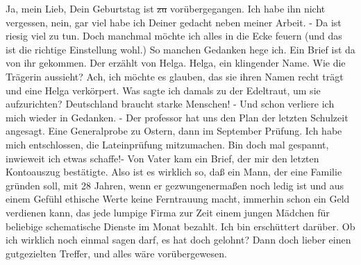 \def\day{27. II. 1944.}
\mktitle

Ja, mein Lieb, Dein Geburtstag ist \st{zu} vor\"{u}bergegangen.
Ich habe ihn nicht vergessen, nein, gar viel habe ich Deiner gedacht neben meiner Arbeit.
- Da ist riesig viel zu tun.
Doch manchmal m\"{o}chte ich alles in die Ecke feuern (und das ist die richtige Einstellung wohl.)
So manchen Gedanken hege ich.
Ein Brief ist da von ihr gekommen.
Der erz\"{a}hlt von Helga.
Helga, ein klingender Name.
Wie die Tr\"{a}gerin aussieht?
Ach, ich m\"{o}chte es glauben, das sie ihren Namen recht tr\"{a}gt und eine Helga verk\"{o}rpert.
Was sagte ich damals zu der Edeltraut, um sie aufzurichten?
Deutschland braucht starke Menschen!
- Und schon verliere ich mich wieder in Gedanken.
- Der professor hat uns den Plan der letzten Schulzeit angesagt.
Eine Generalprobe zu Ostern, dann im September Pr\"{u}fung.
Ich habe mich entschlossen, die Lateinpr\"{u}fung mitzumachen.
Bin doch mal gespannt, inwieweit ich etwas schaffe!-
Von Vater kam ein Brief, der mir den letzten Kontoauszug best\"{a}tigte.
Also ist es wirklich so, da{\ss} ein Mann, der eine Familie gr\"{u}nden soll, mit 28 Jahren, wenn er gezwungenerma{\ss}en noch ledig ist und aus einem Gef\"{u}hl ethische Werte keine Ferntrauung macht, immerhin schon ein Geld verdienen kann, das jede lumpige Firma zur Zeit einem jungen M\"{a}dchen f\"{u}r beliebige schematische Dienste im Monat bezahlt.
Ich bin ersch\"{u}ttert dar\"{u}ber.
Ob ich wirklich noch einmal sagen darf, es hat doch gelohnt?
Dann doch lieber einen gutgezielten Treffer, und alles w\"{a}re vor\"{u}bergewesen.

\clearpage
